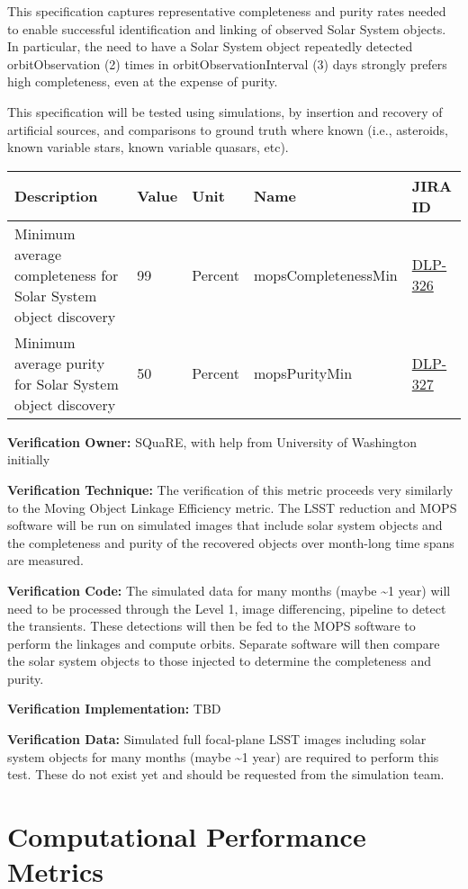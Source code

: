 \documentclass[DM,lsstdraft,toc]{lsstdoc}
\newcommand{\jira}[1]{\href{https://jira.lsstcorp.org/browse/#1}{#1}}
\begin{document}
This specification captures representative completeness and purity rates
needed to enable successful identification and linking of observed Solar
System objects. In particular, the need to have a Solar System object
repeatedly detected orbitObservation (2) times in
orbitObservationInterval (3) days strongly prefers high completeness,
even at the expense of purity.

This specification will be tested using simulations, by insertion and
recovery of artificial sources, and comparisons to ground truth where
known (i.e., asteroids, known variable stars, known variable quasars,
etc).

\begin{longtable}[]{@{}p{}llll@{}}
\toprule
Description & Value & Unit & Name & JIRA ID\tabularnewline
\midrule
\endhead
Minimum average completeness for Solar System object discovery & 99 &
Percent & mopsCompletenessMin & \jira{DLP-326}\tabularnewline
Minimum average purity for Solar System object discovery & 50 & Percent
& mopsPurityMin & \jira{DLP-327}\tabularnewline
\bottomrule
\end{longtable}

\textbf{Verification Owner:} SQuaRE, with help from University of
Washington initially

\textbf{Verification Technique:} The verification of this metric
proceeds very similarly to the Moving Object Linkage Efficiency metric.
The LSST reduction and MOPS software will be run on simulated images
that include solar system objects and the completeness and purity of the
recovered objects over month-long time spans are measured.

\textbf{Verification Code:} The simulated data for many months (maybe
\textasciitilde{}1 year) will need to be processed through the Level 1,
image differencing, pipeline to detect the transients. These detections
will then be fed to the MOPS software to perform the linkages and
compute orbits. Separate software will then compare the solar system
objects to those injected to determine the completeness and purity.

\textbf{Verification Implementation:} TBD

\textbf{Verification Data:} Simulated full focal-plane LSST images
including solar system objects for many months (maybe \textasciitilde{}1
year) are required to perform this test. These do not exist yet and
should be requested from the simulation team.

\section{Computational Performance
Metrics}\label{computational-performance-metrics}
\end{document}
